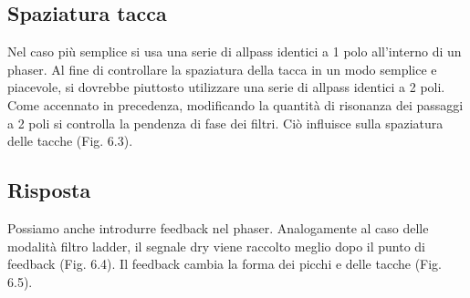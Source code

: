 \subsection{Spaziatura tacca}

Nel caso più semplice si usa una serie di allpass identici a 1 polo all'interno di un phaser. Al fine di controllare la spaziatura della tacca in un modo semplice e piacevole, si dovrebbe piuttosto utilizzare una serie di allpass identici a 2 poli. Come accennato in precedenza, modificando la quantità di risonanza dei passaggi a 2 poli si controlla la pendenza di fase dei filtri. Ciò influisce sulla spaziatura delle tacche (Fig. 6.3).

\subsection{Risposta}

Possiamo anche introdurre feedback nel phaser. Analogamente al caso delle modalità filtro ladder, il segnale dry viene raccolto meglio dopo il punto di feedback (Fig. 6.4). Il feedback cambia la forma dei picchi e delle tacche (Fig. 6.5).
